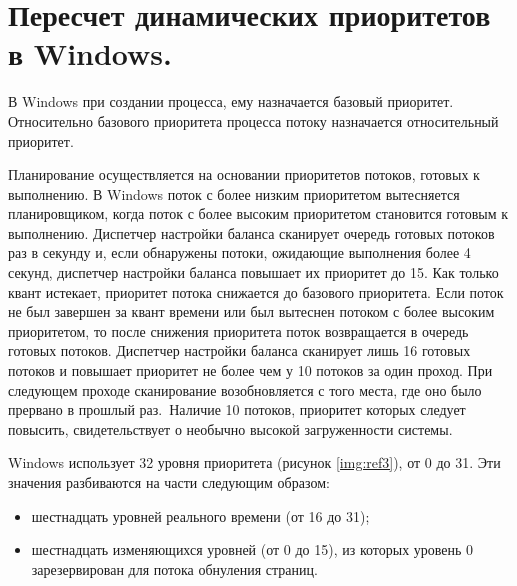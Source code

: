 \section{Пересчет динамических приоритетов в Windows.}

В Windows при создании процесса, ему назначается базовый приоритет.
Относительно базового приоритета процесса потоку назначается относительный приоритет.

Планирование осуществляется на основании приоритетов потоков, готовых к выполнению.
В Windows поток с более низким приоритетом вытесняется планировщиком, когда поток 
с более высоким приоритетом становится готовым к выполнению.
Диспетчер настройки баланса сканирует очередь готовых потоков раз в секунду и,
если обнаружены потоки, ожидающие выполнения более 4
секунд, диспетчер настройки баланса повышает их приоритет до 15. 
Как только квант истекает, приоритет потока снижается до базового приоритета.
Если поток не был завершен за квант времени или был вытеснен потоком с более высоким приоритетом, то после снижения приоритета поток
возвращается в очередь готовых потоков. 
Диспетчер настройки баланса сканирует лишь 16 готовых потоков
и повышает приоритет не более чем у 10 потоков за один проход.
При следующем проходе сканирование возобновляется
с того места, где оно было прервано в прошлый раз.\
Наличие 10 потоков, приоритет которых следует повысить,
свидетельствует о необычно высокой загруженности системы.

Windows использует 32 уровня приоритета (рисунок \ref{img:ref3}), от 0 до 31. Эти значения
разбиваются на части следующим образом:

\begin{itemize}
	\item шестнадцать уровней реального времени (от 16 до 31);
	\item шестнадцать изменяющихся уровней (от 0 до 15), из которых
	      уровень 0 зарезервирован для потока обнуления страниц.
\end{itemize}


\begin{figure}[ht!]
\end{figure}

